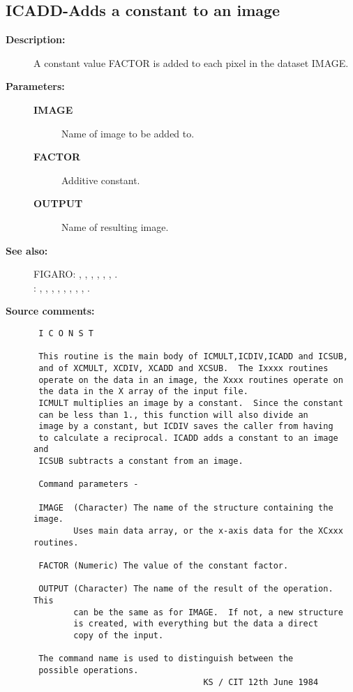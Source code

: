 \subsection{ICADD-\label{ICADD}Adds a constant to an image}
\begin{description}

\item [{\bf Description:}]
 A constant value FACTOR is added to each pixel in the dataset
 IMAGE.

\item [{\bf Parameters:}]
\begin{description}
\item [{\bf IMAGE}]
 Name of image to be added to.
\item [{\bf FACTOR}]
 Additive constant.
\item [{\bf OUTPUT}]
 Name of resulting image.
\end{description}

\item [{\bf See also:}]
FIGARO: , , , , , , .\\
: , , , , , , , , .\\

\item [{\bf Source comments:}]
\begin{verbatim}
 I C O N S T

 This routine is the main body of ICMULT,ICDIV,ICADD and ICSUB,
 and of XCMULT, XCDIV, XCADD and XCSUB.  The Ixxxx routines
 operate on the data in an image, the Xxxx routines operate on
 the data in the X array of the input file.
 ICMULT multiplies an image by a constant.  Since the constant
 can be less than 1., this function will also divide an
 image by a constant, but ICDIV saves the caller from having
 to calculate a reciprocal. ICADD adds a constant to an image and
 ICSUB subtracts a constant from an image.

 Command parameters -

 IMAGE  (Character) The name of the structure containing the image.
        Uses main data array, or the x-axis data for the XCxxx routines.

 FACTOR (Numeric) The value of the constant factor.

 OUTPUT (Character) The name of the result of the operation.  This
        can be the same as for IMAGE.  If not, a new structure
        is created, with everything but the data a direct
        copy of the input.

 The command name is used to distinguish between the
 possible operations.
                                  KS / CIT 12th June 1984
\end{verbatim}
\end{description}

